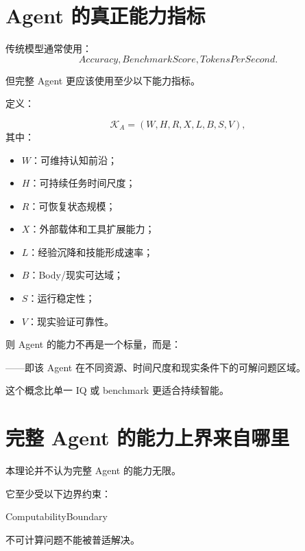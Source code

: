 \section{Agent 的真正能力指标}

传统模型通常使用：
\begin{equation}
Accuracy,
BenchmarkScore,
TokensPerSecond.
\end{equation}

但完整 Agent 更应该使用至少以下能力指标。

定义：

\begin{equation}
\mathcal K_A
=
\left(
W,
H,
R,
X,
L,
B,
S,
V
\right),
\end{equation}
其中：

\begin{itemize}
    \item $W$：可维持认知前沿；
    \item $H$：可持续任务时间尺度；
    \item $R$：可恢复状态规模；
    \item $X$：外部载体和工具扩展能力；
    \item $L$：经验沉降和技能形成速率；
    \item $B$：Body/现实可达域；
    \item $S$：运行稳定性；
    \item $V$：现实验证可靠性。
\end{itemize}

则 Agent 的能力不再是一个标量，而是：
\begin{statementbox}
\centering
{}
\end{statementbox}
——即该 Agent 在不同资源、时间尺度和现实条件下的可解问题区域。

这个概念比单一 IQ 或 benchmark 更适合持续智能。

\section{完整 Agent 的能力上界来自哪里}

本理论并不认为完整 Agent 的能力无限。

它至少受以下边界约束：

\begin{statementbox}
ComputabilityBoundary
\end{statementbox}

不可计算问题不能被普适解决。

